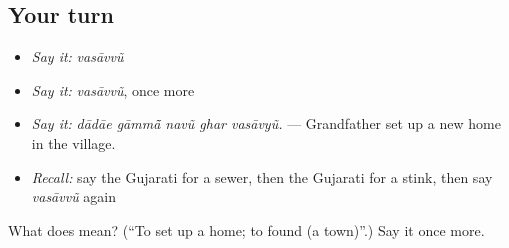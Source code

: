 \subsection*{Your turn}
\begin{itemize}
\raggedright
  \item \emph{Say it:} \emph{vasāvvũ}
  \item \emph{Say it:} \emph{vasāvvũ}, once more
  \item \emph{Say it:} \emph{dādāe gāmmā̃ navũ ghar vasāvyũ.} — Grandfather set up a new home in the village.
  \item \emph{Recall:} say the Gujarati for a sewer, then the Gujarati for a stink, then say \emph{vasāvvũ} again
\end{itemize}

\begin{tcolorbox}[breakable,colback=teal!4,colframe=teal!35!black,title={Before you move on}]
What does  mean? (\textquotedblleft{}To set up a home; to found (a town)\textquotedblright{}.) Say it once more.
\end{tcolorbox}
